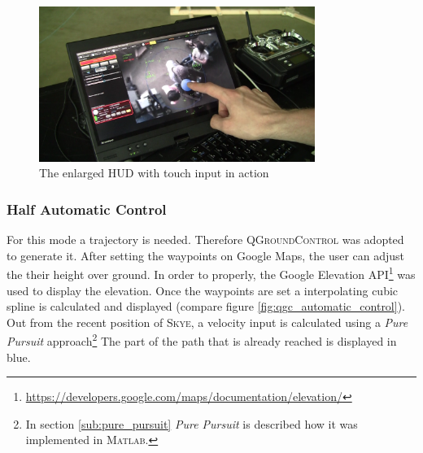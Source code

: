 \begin{figure}[H] %
	\begin{center}
		\includegraphics[width=0.8\textwidth]{graphics/TouchInput}
		\caption{The enlarged HUD with touch input in action}  
		\label{fig:touchInput}		
	\end{center}
\end{figure}


\subsubsection{Half Automatic Control}
For this mode a trajectory is needed. Therefore \textsc{QGroundControl} was adopted to generate it. After setting the waypoints on Google Maps, the user can adjust the their height over ground. In order to properly, the Google Elevation API\footnote{\url{https://developers.google.com/maps/documentation/elevation/}} was used to display the elevation. Once the waypoints are set a interpolating cubic spline is calculated and displayed (compare figure \ref{fig:qgc_automatic_control}). Out from the recent position of \textsc{Skye}, a velocity input is calculated using a \textit{Pure Pursuit} approach\footnote{In section \ref{sub:pure_pursuit} \textit{Pure Pursuit} is described how it was implemented in \textsc{Matlab}.} The part of the path that is already reached is displayed in blue. %

